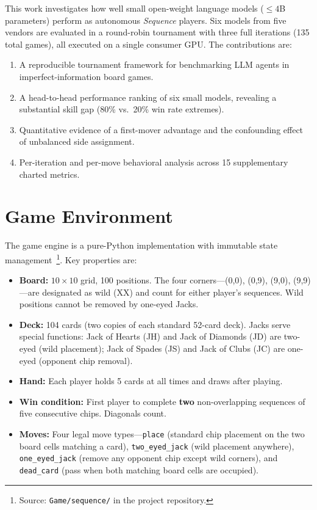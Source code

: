 \documentclass[11pt]{article}
\begin{document}
This work investigates how well small open-weight language models ($\leq 4$B parameters) perform as autonomous \textit{Sequence} players. Six models from five vendors are evaluated in a round-robin tournament with three full iterations (135 total games), all executed on a single consumer GPU. The contributions are:

\begin{enumerate}[nosep]
\item A reproducible tournament framework for benchmarking LLM agents in imperfect-information board games.
\item A head-to-head performance ranking of six small models, revealing a substantial skill gap (80\% vs.\ 20\% win rate extremes).
\item Quantitative evidence of a first-mover advantage and the confounding effect of unbalanced side assignment.
\item Per-iteration and per-move behavioral analysis across 15 supplementary charted metrics.
\end{enumerate}

\section{Game Environment}

The game engine is a pure-Python implementation with immutable state management~\footnote{Source: \texttt{Game/sequence/} in the project repository.}. Key properties are:

\begin{itemize}[nosep]
\item \textbf{Board:} $10 \times 10$ grid, 100 positions. The four corners---(0,0), (0,9), (9,0), (9,9)---are designated as wild (XX) and count for either player's sequences. Wild positions cannot be removed by one-eyed Jacks.
\item \textbf{Deck:} 104 cards (two copies of each standard 52-card deck). Jacks serve special functions: Jack of Hearts (JH) and Jack of Diamonds (JD) are two-eyed (wild placement); Jack of Spades (JS) and Jack of Clubs (JC) are one-eyed (opponent chip removal).
\item \textbf{Hand:} Each player holds 5 cards at all times and draws after playing.
\item \textbf{Win condition:} First player to complete \textbf{two} non-overlapping sequences of five consecutive chips. Diagonals count.
\item \textbf{Moves:} Four legal move types---\texttt{place} (standard chip placement on the two board cells matching a card), \texttt{two\_eyed\_jack} (wild placement anywhere), \texttt{one\_eyed\_jack} (remove any opponent chip except wild corners), and \texttt{dead\_card} (pass when both matching board cells are occupied).
\end{itemize}
\end{document}
